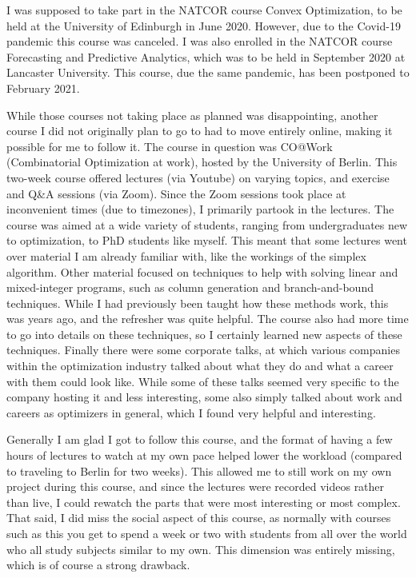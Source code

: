 \documentclass[a4paper,12pt]{article}
\begin{document}
I was supposed to take part in the NATCOR course Convex Optimization, to be held at the University of Edinburgh in June 2020. However, due to the Covid-19 pandemic this course was canceled. I was also enrolled in the NATCOR course Forecasting and Predictive Analytics, which was to be held in September 2020 at Lancaster University. This course, due the same pandemic, has been postponed to February 2021. 

\bigskip

While those courses not taking place as planned was disappointing, another course I did not originally plan to go to had to move entirely online, making it possible for me to follow it. The course in question was CO@Work (Combinatorial Optimization at work), hosted by the University of Berlin. This two-week course offered lectures (via Youtube) on varying topics, and exercise and Q\&A sessions (via Zoom). Since the Zoom sessions took place at inconvenient times (due to timezones), I primarily partook in the lectures. The course was aimed at a wide variety of students, ranging from undergraduates new to optimization, to PhD students like myself. This meant that some lectures went over material I am already familiar with, like the workings of the simplex algorithm. Other material focused on techniques to help with solving linear and mixed-integer programs, such as column generation and branch-and-bound techniques. While I had previously been taught how these methods work, this was years ago, and the refresher was quite helpful. The course also had more time to go into details on these techniques, so I certainly learned new aspects of these techniques. Finally there were some corporate talks, at which various companies within the optimization industry talked about what they do and what a career with them could look like. While some of these talks seemed very specific to the company hosting it and less interesting, some also simply talked about work and careers as optimizers in general, which I found very helpful and interesting. 

Generally I am glad I got to follow this course, and the format of having a few hours of lectures to watch at my own pace helped lower the workload (compared to traveling to Berlin for two weeks). This allowed me to still work on my own project during this course, and since the lectures were recorded videos rather than live, I could rewatch the parts that were most interesting or most complex. That said, I did miss the social aspect of this course, as normally with courses such as this you get to spend a week or two with students from all over the world who all study subjects similar to my own. This dimension was entirely missing, which is of course a strong drawback. 
\end{document}
